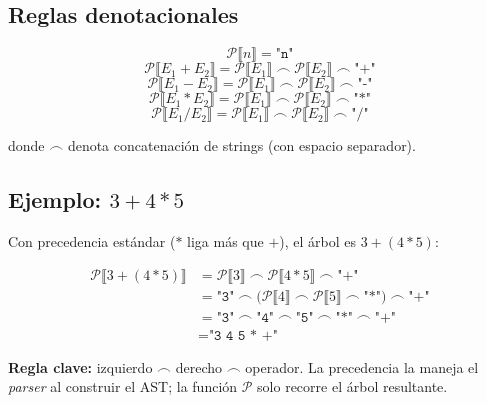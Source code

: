 \documentclass[11pt]{article}
\begin{document}
\subsection*{Reglas denotacionales}

\[
  \mathcal{P}\llbracket n \rrbracket = \texttt{"n"}
\]
\[
  \mathcal{P}\llbracket E_1 + E_2 \rrbracket
    = \mathcal{P}\llbracket E_1 \rrbracket
      \;\frown\; \mathcal{P}\llbracket E_2 \rrbracket
      \;\frown\; \texttt{"+"}
\]
\[
  \mathcal{P}\llbracket E_1 - E_2 \rrbracket
    = \mathcal{P}\llbracket E_1 \rrbracket
      \;\frown\; \mathcal{P}\llbracket E_2 \rrbracket
      \;\frown\; \texttt{"-"}
\]
\[
  \mathcal{P}\llbracket E_1 * E_2 \rrbracket
    = \mathcal{P}\llbracket E_1 \rrbracket
      \;\frown\; \mathcal{P}\llbracket E_2 \rrbracket
      \;\frown\; \texttt{"*"}
\]
\[
  \mathcal{P}\llbracket E_1 / E_2 \rrbracket
    = \mathcal{P}\llbracket E_1 \rrbracket
      \;\frown\; \mathcal{P}\llbracket E_2 \rrbracket
      \;\frown\; \texttt{"/"}
\]

donde $\frown$ denota concatenación de strings (con espacio separador).

\subsection*{Ejemplo: $3 + 4 * 5$}

Con precedencia estándar ($*$ liga más que $+$), el árbol es
$3 + (4 * 5)$:

\begin{align*}
  \mathcal{P}\llbracket 3 + (4 * 5) \rrbracket
    &= \mathcal{P}\llbracket 3 \rrbracket
       \;\frown\; \mathcal{P}\llbracket 4 * 5 \rrbracket
       \;\frown\; \texttt{"+"} \\
    &= \texttt{"3"}
       \;\frown\;
       \bigl(\mathcal{P}\llbracket 4 \rrbracket
             \;\frown\; \mathcal{P}\llbracket 5 \rrbracket
             \;\frown\; \texttt{"*"}\bigr)
       \;\frown\; \texttt{"+"} \\
    &= \texttt{"3"} \;\frown\; \texttt{"4"} \;\frown\;
       \texttt{"5"} \;\frown\; \texttt{"*"} \;\frown\; \texttt{"+"} \\
    &= \texttt{"3 4 5 * +"}
\end{align*}

\begin{tcolorbox}
  \textbf{Regla clave:} izquierdo $\frown$ derecho $\frown$ operador.
  La precedencia la maneja el \emph{parser} al construir el AST;
  la función $\mathcal{P}$ solo recorre el árbol resultante.
\end{tcolorbox}
\end{document}
